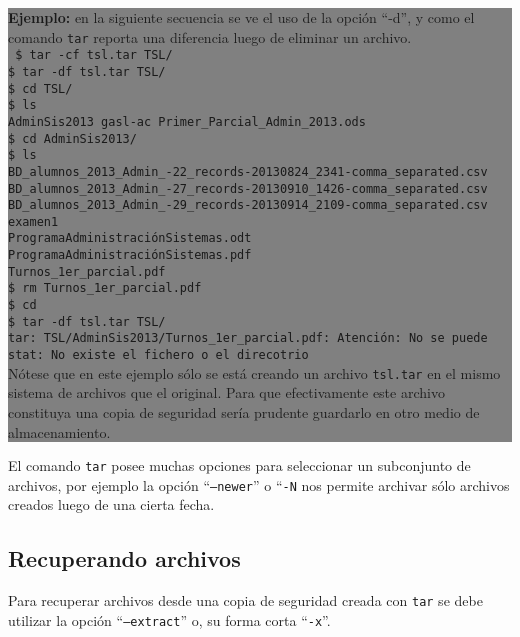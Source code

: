\documentclass[12pt]{article}
\begin{document}
\colorbox{grey}{\parbox[t]{0.95\linewidth}{ \vspace*{0.5cm} { 
{\bf Ejemplo:} en la siguiente secuencia se ve el uso de la opción ``-d'',
y como el comando \texttt{tar} reporta una diferencia luego de eliminar 
un archivo.\\ 
{\tt
\$ tar -cf tsl.tar TSL/\\
\$ tar -df tsl.tar TSL/\\
\$ cd TSL/\\
\$ ls\\
AdminSis2013  gasl-ac  Primer\_Parcial\_Admin\_2013.ods\\
\$ cd AdminSis2013/\\
\$ ls\\
BD\_alumnos\_2013\_Admin\_-22\_records-20130824\_2341-comma\_separated.csv\\
BD\_alumnos\_2013\_Admin\_-27\_records-20130910\_1426-comma\_separated.csv\\
BD\_alumnos\_2013\_Admin\_-29\_records-20130914\_2109-comma\_separated.csv\\
examen1\\
ProgramaAdministraciónSistemas.odt\\
ProgramaAdministraciónSistemas.pdf\\
Turnos\_1er\_parcial.pdf\\
\$ rm Turnos\_1er\_parcial.pdf \\
\$ cd \\
\$ tar -df tsl.tar TSL/\\
tar: TSL/AdminSis2013/Turnos\_1er\_parcial.pdf: Atención: No se puede stat:
No existe el fichero o el direcotrio\\
}
Nótese que en este ejemplo sólo se está creando un  archivo {\tt tsl.tar} 
en el mismo sistema de archivos que el original. Para que efectivamente 
este archivo constituya una copia de seguridad sería prudente guardarlo 
en otro medio de almacenamiento. 
} \vspace*{0.5cm} } } 

El comando {\tt tar} posee muchas opciones para seleccionar un subconjunto
de archivos, por ejemplo la opción ``{\tt --newer}'' o ``{\tt -N} nos 
permite archivar sólo archivos creados luego de una cierta fecha.  

\subsection*{Recuperando archivos }

Para recuperar archivos desde una copia de seguridad creada con {\tt tar} se
debe utilizar la opción ``{\tt --extract}'' o, su forma corta ``{\tt -x}''. 
\end{document}
